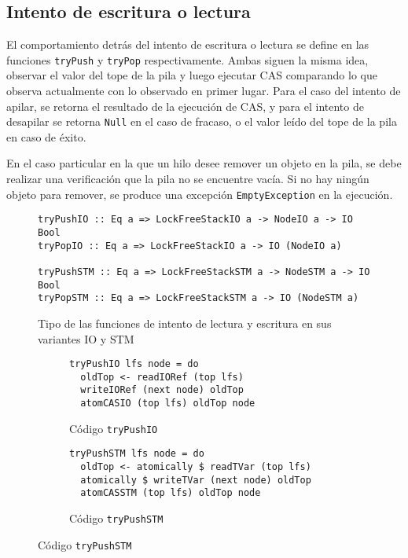 \clearpage
\subsection{Intento de escritura o lectura}\label{sub:lfs-intentos}
El comportamiento detrás del intento de escritura o lectura se define en las funciones \texttt{tryPush} y \texttt{tryPop} respectivamente. Ambas siguen la misma idea, observar el valor del tope de la pila y luego ejecutar CAS comparando lo que observa actualmente con lo observado en primer lugar. Para el caso del intento de apilar, se retorna el resultado de la ejecución de CAS, y para el intento de desapilar se retorna \texttt{Null} en el caso de fracaso, o el valor leído del tope de la pila en caso de éxito.

En el caso particular en la que un hilo desee remover un objeto en la pila, se debe realizar una verificación que la pila no se encuentre vacía. Si no hay ningún objeto para remover, se produce una excepción \texttt{EmptyException} en la ejecución.

\begin{figure}[H]\label{intentos-types}
  \begin{verbatim}
tryPushIO :: Eq a => LockFreeStackIO a -> NodeIO a -> IO Bool
tryPopIO :: Eq a => LockFreeStackIO a -> IO (NodeIO a)

tryPushSTM :: Eq a => LockFreeStackSTM a -> NodeSTM a -> IO Bool
tryPopSTM :: Eq a => LockFreeStackSTM a -> IO (NodeSTM a)
  \end{verbatim}
  \caption{Tipo de las funciones de intento de lectura y escritura en sus variantes IO y STM}
\end{figure}

\begin{figure}[H]\label{intentos-code}
  \begin{subfigure}[b]{0.5\textwidth}
  \begin{verbatim}
tryPushIO lfs node = do
  oldTop <- readIORef (top lfs)
  writeIORef (next node) oldTop
  atomCASIO (top lfs) oldTop node
  \end{verbatim}
  \caption{Código \texttt{tryPushIO}}
  \end{subfigure}
  \begin{subfigure}[b]{0.5\textwidth}
    \begin{verbatim}
tryPushSTM lfs node = do
  oldTop <- atomically $ readTVar (top lfs)
  atomically $ writeTVar (next node) oldTop
  atomCASSTM (top lfs) oldTop node
    \end{verbatim}
    \caption{Código \texttt{tryPushSTM}}
\end{subfigure}
\end{figure}

